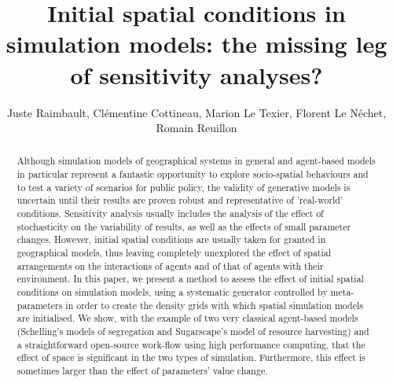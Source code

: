 \documentclass[Royal,sageh,times]{sagej}
\begin{document}




\title{Initial spatial conditions in simulation models: the missing leg of sensitivity analyses?}

\author{Juste Raimbault, 
Cl{\' e}mentine Cottineau,
Marion Le Texier, 
Florent Le N{\' e}chet, 
Romain Reuillon
}








\begin{abstract}
Although simulation models of geographical systems in general and agent-based models in particular represent a fantastic opportunity to explore socio-spatial behaviours and to test a variety of scenarios for public policy, the validity of generative models is uncertain until their results are proven robust and representative of 'real-world' conditions. Sensitivity analysis usually includes the analysis of the effect of stochasticity on the variability of results, as well as the effects of small parameter changes. However, initial spatial conditions are usually taken for granted in geographical models, thus leaving completely unexplored the effect of spatial arrangements on the interactions of agents and of that of agents with their environment. In this paper, we present a method to assess the effect of initial spatial conditions on simulation models, using a systematic generator controlled by meta-parameters in order to create the density grids with which spatial simulation models are initialised. We show, with the example of two very classical agent-based models (Schelling's models of segregation and Sugarscape's model of resource harvesting) and a straightforward open-source work-flow using high performance computing, that the effect of space is significant in the two types of simulation. Furthermore, this effect is sometimes larger than the effect of parameters' value change. 
\end{abstract}
\end{document}
